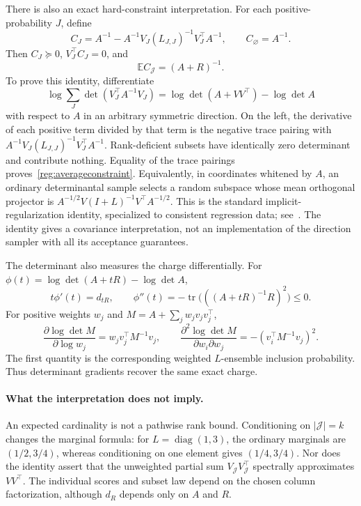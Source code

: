 \documentclass[11pt]{amsart}
\theoremstyle{definition}\newtheorem{definition}[theorem]{Definition}
\theoremstyle{remark}\newtheorem{remark}[theorem]{Remark}
\numberwithin{equation}{section}
\begin{document}
There is also an exact hard-constraint interpretation.
For each positive-probability $J$, define
\[
 C_J=A^{-1}-A^{-1}V_J(L_{J,J})^{-1}V_J^\top A^{-1},
 \qquad C_\varnothing=A^{-1}.
\]
Then $C_J\succeq0$, $V_J^\top C_J=0$, and
\begin{equation}\label{reg:averageconstraint}
 \mathbb E C_{\mathcal J}=(A+R)^{-1}.
\end{equation}
To prove this identity, differentiate
\[
 \log\!\sum_J\det(V_J^\top A^{-1}V_J)
 =\log\det(A+VV^\top)-\log\det A
\]
with respect to $A$ in an arbitrary symmetric direction.  On the left,
the derivative of each positive term divided by that term is the negative
trace pairing with $A^{-1}V_J(L_{J,J})^{-1}V_J^\top A^{-1}$.
Rank-deficient subsets have identically zero determinant and contribute
nothing.  Equality of the trace pairings proves~\eqref{reg:averageconstraint}.
Equivalently, in coordinates whitened by $A$, an ordinary determinantal
sample selects a random subspace whose mean orthogonal projector is
$A^{-1/2}V(I+L)^{-1}V^\top A^{-1/2}$.
This is the standard implicit-regularization identity, specialized to
consistent regression data; see~\cite[Theorem~3]{DMdpp}.
The identity gives a covariance interpretation, not an implementation of
the direction sampler with all its acceptance guarantees.

The determinant also measures the charge differentially.  For
$\phi(t)=\log\det(A+tR)-\log\det A$,
\[
 t\phi'(t)=d_{tR},\qquad
 \phi''(t)=-\operatorname{tr}\bigl(((A+tR)^{-1}R)^2\bigr)\leq0.
\]
For positive weights $w_j$ and $M=A+\sum_jw_jv_jv_j^\top$,
\[
 \frac{\partial\log\det M}{\partial\log w_j}
 =w_jv_j^\top M^{-1}v_j,\qquad
 \frac{\partial^2\log\det M}{\partial w_i\partial w_j}
 =-(v_i^\top M^{-1}v_j)^2.
\]
The first quantity is the corresponding weighted $L$-ensemble inclusion
probability.  Thus determinant gradients recover the same exact charge.

\paragraph{What the interpretation does not imply.}
An expected cardinality is not a pathwise rank bound.  Conditioning on
$|\mathcal J|=k$ changes the marginal formula: for
$L=\operatorname{diag}(1,3)$, the ordinary marginals are $(1/2,3/4)$,
whereas conditioning on one element gives $(1/4,3/4)$.
Nor does the identity assert that the unweighted partial sum
$V_{\mathcal J}V_{\mathcal J}^\top$ spectrally approximates $VV^\top$.
The individual scores and subset law depend on the chosen column
factorization, although $d_R$ depends only on $A$ and $R$.
\end{document}
